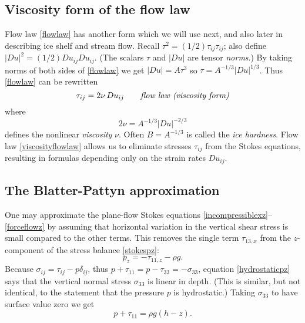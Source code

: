 \documentclass[letterpaper,final,12pt,reqno]{amsart}
\begin{document}
\subsection*{Viscosity form of the flow law}  Flow law \eqref{flowlaw} has another form which we will use next, and also later in describing ice shelf and stream flow.  Recall $\tau^2 = (1/2) \tau_{ij} \tau_{ij}$; also define $|Du|^2 = (1/2) Du_{ij} Du_{ij}$.  (The scalars $\tau$ and $|Du|$ are tensor \emph{norms}.)  By taking norms of both sides of \eqref{flowlaw} we get $|Du| = A \tau^3$ so $\tau = A^{-1/3} |Du|^{1/3}$.  Thus \eqref{flowlaw} can be rewritten
\begin{equation}
\tau_{ij} = 2 \nu\, Du_{ij}  \qquad \text{\emph{flow law (viscosity form)}} \label{viscosityflowlaw}
\end{equation}
where
    $$2\nu = A^{-1/3} |Du|^{-2/3}$$
defines the nonlinear \emph{viscosity} $\nu$.  Often $B = A^{-1/3}$ is called the \emph{ice hardness}.  Flow law \eqref{viscosityflowlaw} allows us to eliminate stresses $\tau_{ij}$ from the Stokes equations, resulting in formulas depending only on the strain rates $Du_{ij}$.

\subsection*{The Blatter-Pattyn approximation}  One may approximate the plane-flow Stokes equations \eqref{incompressiblexz}--\eqref{forceflowz} by assuming that horizontal variation in the vertical shear stress is small compared to the other terms.  This removes the single term  $\tau_{13,x}$ from the $z$-component of the stress balance \eqref{stokespz}:
\begin{equation}
p_z = - \tau_{11,z} - \rho g. \label{hydrostaticpz}
\end{equation}
Because $\sigma_{ij} = \tau_{ij} - p \delta_{ij}$, thus $p + \tau_{11} = p - \tau_{33} = - \sigma_{33}$, equation \eqref{hydrostaticpz} says that the vertical normal stress $\sigma_{33}$ is linear in depth.  (This is similar, but not identical, to the statement that the pressure $p$ is hydrostatic.)  Taking $\sigma_{33}$ to have surface value zero we get
\begin{equation}
p + \tau_{11} = \rho g (h-z). \label{hydrostaticitself}
\end{equation}
\end{document}
